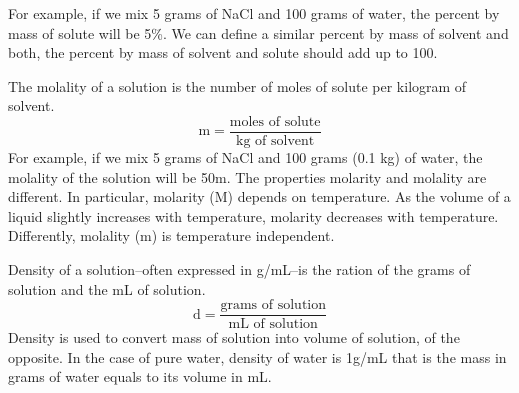 \documentclass[main.tex]{subfiles}
\newcommand\chapterlabel{physicalsolutions}
\begin{document}
\begin{description}
For example, if we mix 5 grams of NaCl and 100 grams of water, the percent by mass of solute will be 5\%. We can define a similar percent by mass of solvent and both, the percent by mass of solvent and solute should add up to 100.
\item[\docfilehook{Molality, m}{}] 
The molality of a solution is the number of moles of solute per kilogram of solvent.
\begin{equation}
\boxed{ \text{m}=\frac{\text{moles of solute}}{\text{kg of solvent}}} \label{\chapterlabel:equation5}
\end{equation}
For example, if we mix 5 grams of NaCl and 100 grams (0.1 kg) of water, the molality of the solution will be 50m. The properties molarity and molality are different. In particular, molarity (M) depends on temperature. As the volume of a liquid slightly increases with temperature, molarity decreases with temperature. Differently, molality (m) is temperature independent.
\item[\docfilehook{Density of a solution, d}{}] 
Density of a solution--often expressed in g/mL--is the ration of the grams of solution and the mL of solution.
\begin{equation}
\boxed{ \text{d}=\frac{\text{grams of solution}}{\text{mL of solution}} }\label{\chapterlabel:equation6}
\end{equation}
Density is used to convert mass of solution into volume of solution, of the opposite. In the case of pure water, density of water is 1g/mL that is the mass in grams of water equals to its volume in mL. 



\end{description}
\end{document}
